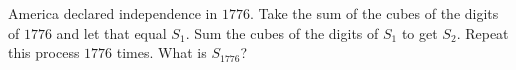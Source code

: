 America declared independence in $1776$. Take the sum of the cubes of the digits of $1776$ and let that equal $S_1$. Sum the cubes of the digits of $S_1$ to get $S_2$. Repeat this process $1776$ times. What is $S_{1776}$?
